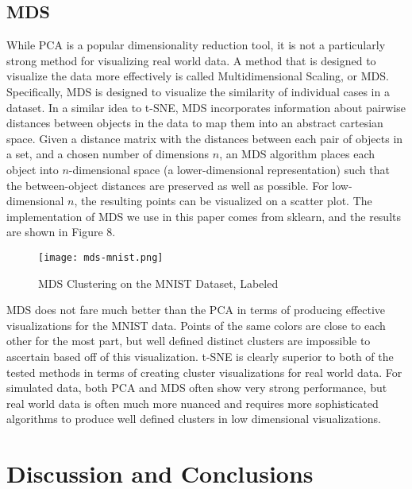 \documentclass{article}
\begin{document}
\subsection*{MDS}

While PCA is a popular dimensionality reduction tool, it is not a particularly strong method for visualizing real world data. A method that is designed to visualize the data more effectively is called Multidimensional Scaling, or MDS. Specifically, MDS is designed to visualize the similarity of individual cases in a dataset. In a similar idea to t-SNE, MDS incorporates information about pairwise distances between objects in the data to map them into an abstract cartesian space. Given a distance matrix with the distances between each pair of objects in a set, and a chosen number of dimensions $n$, an MDS algorithm places each object into $n$-dimensional space (a lower-dimensional representation) such that the between-object distances are preserved as well as possible. For low-dimensional $n$, the resulting points can be visualized on a scatter plot. The implementation of MDS we use in this paper comes from sklearn, and the results are shown in Figure 8. 

\begin{figure}[H]
\caption{MDS Clustering on the MNIST Dataset, Labeled}
\centering
\texttt{[image: mds-mnist.png]}
\end{figure}

MDS does not fare much better than the PCA in terms of producing effective visualizations for the MNIST data. Points of the same colors are close to each other for the most part, but well defined distinct clusters are impossible to ascertain based off of this visualization. t-SNE is clearly superior to both of the tested methods in terms of creating cluster visualizations for real world data. For simulated data, both PCA and MDS often show very strong performance, but real world data is often much more nuanced and requires more sophisticated algorithms to produce well defined clusters in low dimensional visualizations. 

\section*{Discussion and Conclusions}
\end{document}
